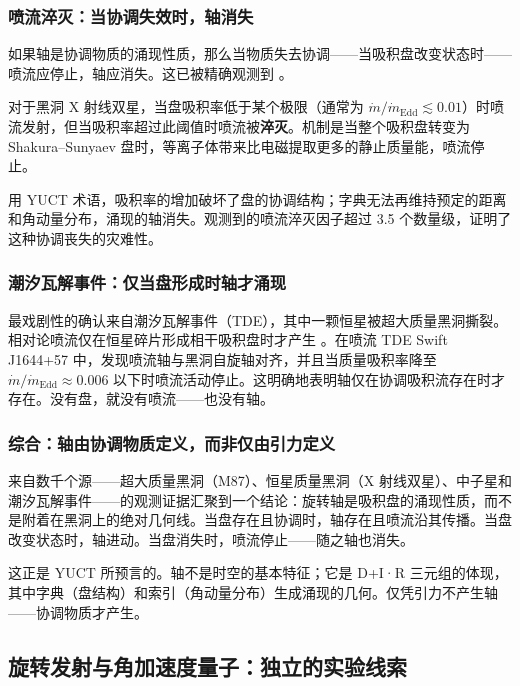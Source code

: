 \documentclass[12pt,a4paper]{article}
\begin{document}
	\subsubsection{喷流淬灭：当协调失效时，轴消失}
	
	如果轴是协调物质的涌现性质，那么当物质失去协调——当吸积盘改变状态时——喷流应停止，轴应消失。这已被精确观测到 \cite{JetQuenching2006,JetQuenching2018}。
	
	对于黑洞 X 射线双星，当盘吸积率低于某个极限（通常为 \(\dot{m}/\dot{m}_{\text{Edd}} \lesssim 0.01\)）时喷流发射，但当吸积率超过此阈值时喷流被\textbf{淬灭}。机制是当整个吸积盘转变为 Shakura–Sunyaev 盘时，等离子体带来比电磁提取更多的静止质量能，喷流停止。
	
	用 YUCT 术语，吸积率的增加破坏了盘的协调结构；字典无法再维持预定的距离和角动量分布，涌现的轴消失。观测到的喷流淬灭因子超过 3.5 个数量级，证明了这种协调丧失的灾难性。
	
	\subsubsection{潮汐瓦解事件：仅当盘形成时轴才涌现}
	
	最戏剧性的确认来自潮汐瓦解事件（TDE），其中一颗恒星被超大质量黑洞撕裂。相对论喷流仅在恒星碎片形成相干吸积盘时才产生 \cite{TDE2016,TDE2020}。在喷流 TDE Swift J1644+57 中，发现喷流轴与黑洞自旋轴对齐，并且当质量吸积率降至 \(\dot{m}/\dot{m}_{\text{Edd}} \approx 0.006\) 以下时喷流活动停止。这明确地表明轴仅在协调吸积流存在时才存在。没有盘，就没有喷流——也没有轴。
	
	\subsubsection{综合：轴由协调物质定义，而非仅由引力定义}
	
	来自数千个源——超大质量黑洞（M87）、恒星质量黑洞（X 射线双星）、中子星和潮汐瓦解事件——的观测证据汇聚到一个结论：旋转轴是吸积盘的涌现性质，而不是附着在黑洞上的绝对几何线。当盘存在且协调时，轴存在且喷流沿其传播。当盘改变状态时，轴进动。当盘消失时，喷流停止——随之轴也消失。
	
	这正是 YUCT 所预言的。轴不是时空的基本特征；它是 D+I·R 三元组的体现，其中字典（盘结构）和索引（角动量分布）生成涌现的几何。仅凭引力不产生轴——协调物质才产生。
	
	\subsection{旋转发射与角加速度量子：独立的实验线索}
	
\end{document}
